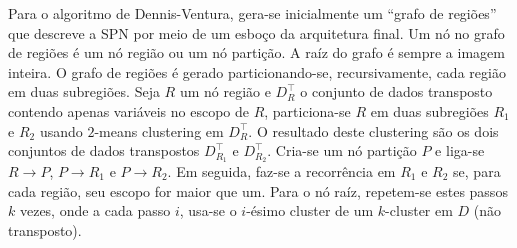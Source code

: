 \documentclass[12pt]{article}
\theoremstyle{plain}
\numberwithin{equation}{section}
\begin{document}
Para o algoritmo de Dennis-Ventura, gera-se inicialmente um ``grafo de regiões'' que descreve a SPN
por meio de um esboço da arquitetura final. Um nó no grafo de regiões é um nó região ou um nó
partição. A raíz do grafo é sempre a imagem inteira. O grafo de regiões é gerado particionando-se,
recursivamente, cada região em duas subregiões. Seja $R$ um nó região e $D_R^\intercal$ o conjunto
de dados transposto contendo apenas variáveis no escopo de $R$, particiona-se $R$ em duas
subregiões $R_1$ e $R_2$ usando $2$-means clustering em $D_R^\intercal$. O resultado deste
clustering são os dois conjuntos de dados transpostos $D_{R_1}^\intercal$ e $D_{R_2}^\intercal$.
Cria-se um nó partição $P$ e liga-se $R\to P$, $P\to R_1$ e $P\to R_2$. Em seguida, faz-se a
recorrência em $R_1$ e $R_2$ se, para cada região, seu escopo for maior que um. Para o nó raíz,
repetem-se estes passos $k$ vezes, onde a cada passo $i$, usa-se o $i$-ésimo cluster de um
$k$-cluster em $D$ (não transposto).
\end{document}

